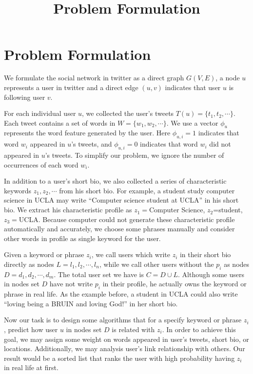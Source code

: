 \documentclass{article}
\begin{document}
\title{Problem Formulation}
\maketitle \else \fi

\section{Problem Formulation}\label{sec:problem}
We formulate the social network in twitter as a direct graph $G(V,E)$,
a node $u$ represents a user in twitter and a direct edge $(u,v)$ indicates
that user $u$ is following user $v$.

For each individual user $u$, we collected the user's tweets
$T(u)=\{t_1, t_2, \cdots\}$.
Each tweet contains a set of words in $W=\{w_1, w_2, \cdots\}$.
We use a vector $\phi_u$ represents the word feature generated by the user.
Here $\phi_{u,i}=1$ indicates that word $w_i$ appeared in $u$'s tweets,
and $\phi_{u,i}=0$ indicates that word $w_i$ did not appeared in $u$'s tweets.
To simplify our problem, we ignore the number of occurrences of each word $w_i$.

In addition to a user's short bio,
we also collected a series of characteristic keywords
$z_1, z_2, \cdots$ from his short bio. For example, a student study computer
science in UCLA may write ``Computer science student at UCLA'' in his short bio.
We extract his characteristic profile as
$z_1=$Computer Science, $z_2$=student, $z_3=$UCLA.
Because computer could not generate these characteristic profile automatically
and accurately, we choose some phrases manually and consider other words in
profile as single keyword for the user.

Given a keyword or phrase $z_i$, we call users which write $z_i$ in their
short bio directly as nodes $L={l_1, l_2, \cdots, l_n}$,
while we call other users without the $p_i$ as nodes $D={d_1, d_2, \cdots, d_m}$.
The total user set we have is $C=D \cup L$.
Although some users in nodes set $D$ have not write $p_i$ in their profile,
he actually owns the keyword or phrase in real life.
As the example before, a student in UCLA could also write
``loving being a BRUIN and loving God!'' in her short bio.

Now our task is to design some algorithms that for a specify keyword or
phrase $z_i$, predict how user $u$ in nodes set $D$ is related with $z_i$.
In order to achieve this goal, we may assign some weight on words appeared
in user's tweets, short bio, or locations. Additionally, we may analysis
user's link relationship with others.
Our result would be a sorted list that ranks the user with high probability
having $z_i$ in real life at first.

\ifx \allfiles \undefined
\end{document}
